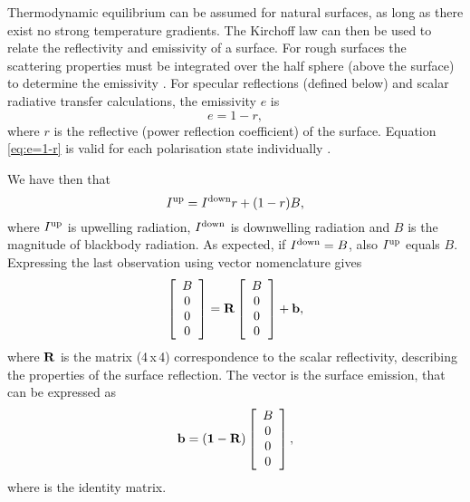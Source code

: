  Thermodynamic equilibrium can be assumed for natural surfaces, as
 long as there exist no strong temperature gradients. The Kirchoff law
 can then be used to relate the reflectivity and emissivity of a
 surface. For rough surfaces the scattering properties must be
 integrated over the half sphere (above the surface) to determine the
 emissivity \citep[see e.g.][Eq.\ 4.186]{ulaby:81}. For specular
 reflections (defined below) and scalar radiative transfer
 calculations, the emissivity $e$ is
 \begin{equation}
  \label{eq:e=1-r}
   e = 1 - r,
 \end{equation}
 where $r$ is the reflective (power reflection coefficient) of the
 surface.  Equation \ref{eq:e=1-r} is valid for each polarisation state
 individually \citep[Eq.\ 4.190a]{ulaby:81}.

 We have then that
 \begin{equation}
  I^\mathrm{up} = I^\mathrm{down}r + (1-r)B,
 \end{equation}
 where $I^\mathrm{up}$ is upwelling radiation, $I^\mathrm{down}$
 is downwelling radiation and $B$ is the magnitude of blackbody
 radiation. As expected, if $I^\mathrm{down}=B$, also
 $I^\mathrm{up}$ equals $B$.  Expressing the last observation using
 vector nomenclature gives
 \begin{equation}
   \left[\begin{array}{c} B \\ 0 \\0\\0 \end{array}\right] =
  \mathbf{R} \left[\begin{array}{c} B \\ 0 \\0\\0 \end{array}\right] + 
  \mathbf{b},
 \end{equation}
 where $\mathbf{R}$ is the matrix (4\,x\,4) correspondence to the
 scalar reflectivity, describing the properties of the surface
 reflection. The vector  is the surface emission, that
 can be expressed as
 \begin{equation}
  \label{eq:surface:bvector} 
  \mathbf{b} = (\mathbf{1}-\mathbf{R})
      \left[\begin{array}{c} B \\ 0 \\0\\0 \end{array}\right],
 \end{equation}
 where  is the identity matrix. 


